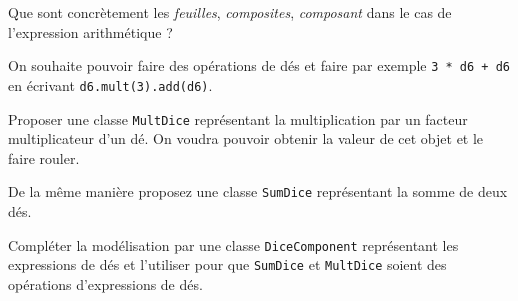 \documentclass[12pt]{article}
\begin{document}
Que sont concrètement les \emph{feuilles}, \emph{composites}, \emph{composant} dans le cas de l'expression arithmétique ?

On souhaite pouvoir faire des opérations de dés et faire par exemple \texttt{3 * d6 + d6} en écrivant \texttt{d6.mult(3).add(d6)}.

Proposer une classe \texttt{MultDice} représentant la multiplication par un facteur multiplicateur d'un dé. On voudra pouvoir obtenir la valeur de cet objet et le faire rouler.

De la même manière proposez une classe \texttt{SumDice} représentant la somme de deux dés.

Compléter la modélisation par une classe \texttt{DiceComponent} représentant les expressions de dés et l'utiliser pour que \texttt{SumDice} et \texttt{MultDice} soient des opérations d'expressions de dés.
\end{document}
